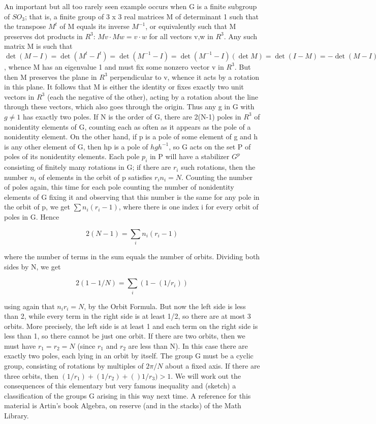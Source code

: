 \documentclass[10pt]{article}
\begin{document}
An important but all too rarely seen example occurs when G is a finite
subgroup of $SO_3$; that is, a finite group of 3 x 3 real matrices M of
determinant 1 such that the transpose $M^t$ of M equals its inverse
$M^{-1}$, or equivalently such that M preserves dot products in $R^3$:
$Mv\cdot Mw = v\cdot w$ for all vectors v,w in $R^3$. Any such matrix M
is such that $\det (M- I) = \det (M^t - I^t) = \det (M^{-1} - I) = \det
(M^{-1} - I)(\det M) = \det (I - M) = -\det (M - I) = 0$, whence M has
an eigenvalue 1 and must fix some nonzero vector v in $R^3$. But then M
preserves the plane in $R^3$ perpendicular to v, whence it acts by a
rotation in this plane. It follows that M is either the identity or
fixes exactly two unit vectors in $R^3$ (each the negative of the
other), acting by a rotation about the line through these vectors, which
also goes through the origin. Thus any g in G with $g\ne1$ has exactly
two poles. If N is the order of G, there are 2(N-1) poles in $R^3$ of
nonidentity elements of G, counting each as often as it appears as the
pole of a nonidentity element. On the other hand, if p is a pole of some
element of g and h is any other element of G, then hp is a pole of
$hgh^{-1}$, so G acts on the set P of poles of its nonidentity elements.
Each pole $p_i$ in P will have a stabilizer $G^p$ consisting of finitely
many rotations in G; if there are $r_i$ such rotations, then the number
$n_i$ of elements in the orbit of p satisfies $r_i n_i = N$. Counting
the number of poles again, this time for each pole counting the number
of nonidentity elements of G fixing it and observing that this number is
the same for any pole in the orbit of p, we get $\sum n_i(r_i - 1)$,
where there is one index i for every orbit of poles in G. Hence

\[
2 (N - 1) = \sum_i n_i(r_i - 1)
\]

where the number of terms in the sum equals the number of orbits.
Dividing both sides by N, we get

\[
2(1 - 1/N) = \sum_i (1- (1/r_i))
\]

using again that $n_i r_i = N$, by the Orbit Formula. But now the left
side is less than 2, while every term in the right side is at least 1/2,
so there are at most 3 orbits. More precisely, the left side is at least
1 and each term on the right side is less than 1, so there cannot be
just one orbit. If there are two orbits, then we must have $r_1 = r_2 =
N$ (since $r_1$ and $r_2$ are less than N). In this case there are
exactly two poles, each lying in an orbit by itself. The group G must be
a cyclic group, consisting of rotations by multiples of $2\pi/N$ about a
fixed axis. If there are three orbits, then $(1/r_1)+(1/r_2)+()1/r_3) >
1.$ We will work out the consequences of this elementary but very famous
inequality and (sketch) a classification of the groups G arising in this
way next time. A reference for this material is Artin's book Algebra, on
reserve (and in the stacks) of the Math Library.
\end{document}
